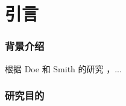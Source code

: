 \section{引言}

\begin{frame}
  \frametitle{背景介绍}
  根据 Doe 和 Smith 的研究 ，...

\end{frame}

\begin{frame}
  \frametitle{研究目的}
\end{frame}
